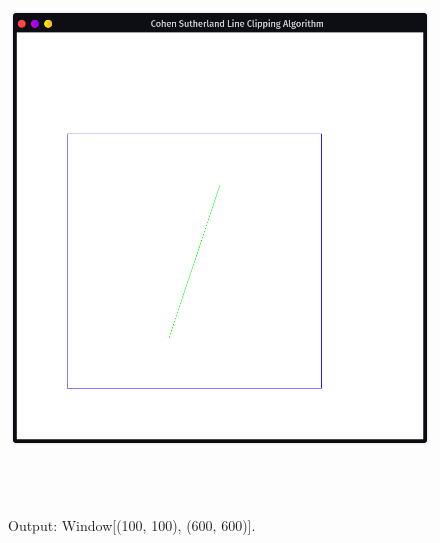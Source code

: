 \documentclass[12pt, a4]{article}
\begin{document}
\subsection*{}
\begin{figure}[h]
\centering
\caption{Output: Window[(100, 100), (600, 600)].}
\includegraphics[height=15cm, width=15cm]{Outputs/Output-2.png}
\end{figure}

\newpage
\end{document}
